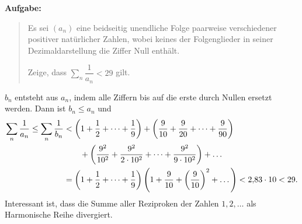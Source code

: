 \documentclass[11pt,a4paper]{article}
\begin{document}
\textbf{Aufgabe:} 
\begin{quote}
  Es sei $(a_n)$ eine beidseitig unendliche Folge paarweise verschiedener
  positiver natürlicher Zahlen, wobei keines der Folgenglieder in seiner
  Dezimaldarstellung die Ziffer Null enthält.

  Zeige, dass $\sum_n{\dfrac{1}{a_n}}<29$ gilt. 
\end{quote}
\begin{loesung}
  $b_n$ entsteht aus $a_n$, indem alle Ziffern bis auf die erste durch Nullen
  ersetzt werden.  Dann ist $b_n\le a_n$ und
  \begin{align*}
    \sum_n{\frac{1}{a_n}}\le\sum_n{\frac{1}{b_n}}&<\left(1+\frac12+\dots+\frac19\right)
    +\left(\frac{9}{10}+\frac{9}{20}+\dots+\frac{9}{90}\right)\\&\qquad
    +\left(\frac{9^2}{10^2}+\frac{9^2}{2\cdot 10^2}+\dots+\frac{9^2}{9\cdot 10^2}\right)+
    \dots\\ &=
    \left(1+\frac12+\dots+\frac19\right)\left(1+\frac{9}{10}+\left(\frac{9}{10}\right)^2+\dots\right)
    <2{,}83\cdot 10 <29.
  \end{align*}
  Interessant ist, dass die Summe aller Reziproken der Zahlen $1,2,\dots$ als
  Harmonische Reihe divergiert.
\end{loesung}
\end{document}
